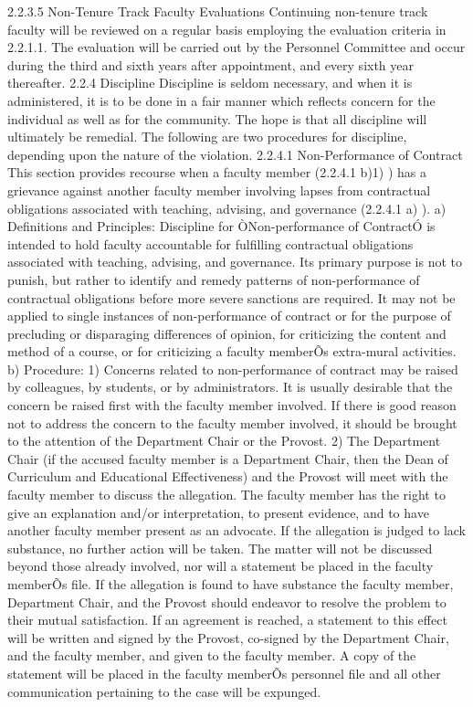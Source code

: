 \documentclass[letterpaper, 11pt]{article}
\begin{document}
2.2.3.5 Non-Tenure Track Faculty Evaluations
   Continuing non-tenure track faculty will be reviewed on a regular basis employing the evaluation criteria in 2.2.1.1.  The evaluation will be carried out by the Personnel Committee and occur during the third and sixth years after appointment, and every sixth year thereafter.
2.2.4 Discipline
   Discipline is seldom necessary, and when it is administered, it is to be done in a fair manner which reflects concern for the individual as well as for the community.  The hope is that all discipline will ultimately be remedial.  The following are two procedures for discipline, depending upon the nature of the violation. 
2.2.4.1 Non-Performance of Contract
   This section provides recourse when a faculty member (2.2.4.1 b)1) ) has a grievance against another faculty member involving lapses from contractual obligations associated with teaching, advising, and governance (2.2.4.1 a) ).
a) Definitions and Principles:
   Discipline for ÒNon-performance of ContractÓ is intended to hold faculty accountable for fulfilling contractual obligations associated with teaching, advising, and governance.  Its primary purpose is not to punish, but rather to identify and remedy patterns of non-performance of contractual obligations before more severe sanctions are required.
   It may not be applied to single instances of non-performance of contract or for the purpose of precluding or disparaging differences of opinion, for criticizing the content and method of a course, or for criticizing a faculty memberÕs extra-mural activities.
b) Procedure:
1) Concerns related to non-performance of contract may be raised by colleagues, by students, or by administrators.  It is usually desirable that the concern be raised first with the faculty member involved.  If there is good reason not to address the concern to the faculty member involved, it should be brought to the attention of the Department Chair or the Provost.
2) The Department Chair (if the accused faculty member is a Department Chair, then the Dean of Curriculum and Educational Effectiveness) and the Provost will meet with the faculty member to discuss the allegation.  The faculty member has the right to give an explanation and/or interpretation, to present evidence, and to have another faculty member present as an advocate.  If the allegation is judged to lack substance, no further action will be taken.  The matter will not be discussed beyond those already involved, nor will a statement be placed in the faculty memberÕs file.  If the allegation is found to have substance the faculty member, Department Chair, and the Provost should endeavor to resolve the problem to their mutual satisfaction.  If an agreement is reached, a statement to this effect will be written and signed by the Provost, co-signed by the Department Chair, and the faculty member, and given to the faculty member.  A copy of the statement will be placed in the faculty memberÕs personnel file and all other communication pertaining to the case will be expunged.
\end{document}
